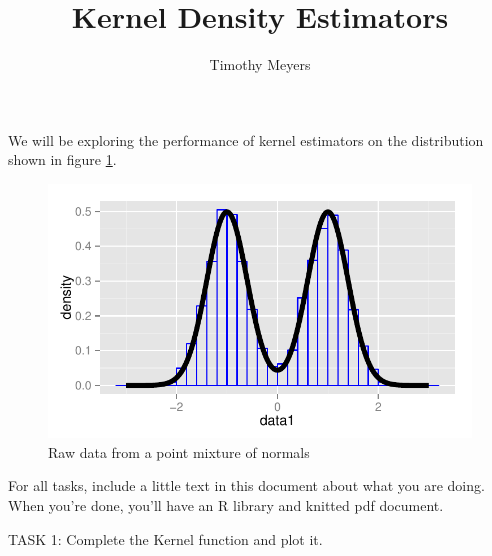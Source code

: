 \documentclass{article}\usepackage[]{graphicx}\usepackage[]{color}
\makeatletter
\def\maxwidth{ %
  \ifdim\Gin@nat@width>\linewidth
    \linewidth
  \else
    \Gin@nat@width
  \fi
}
\newenvironment{knitrout}{}{} %
\makeatother
\begin{document}





\title{Kernel Density Estimators}
\author{Timothy Meyers}
\maketitle

We will be exploring the performance of kernel estimators on the distribution shown in figure \ref{fig:plot_raw_data}.

\begin{knitrout}
\color{fgcolor}\begin{figure}[h!]


{\centering \includegraphics[width=\maxwidth]{figure/plot_raw_data} 

}

\caption[Raw data from a point mixture of normals]{Raw data from a point mixture of normals\label{fig:plot_raw_data}}
\end{figure}


\end{knitrout}

For all tasks, include a little text in this document about what you are doing.  When you're done, you'll have an R library and knitted pdf document.

TASK 1: Complete the Kernel function and plot it.
\end{document}
